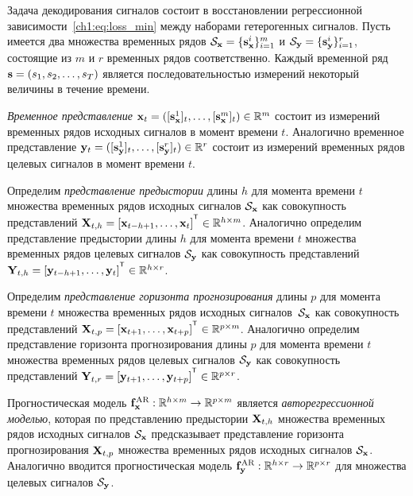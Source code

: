 \documentclass[11pt, a5paper]{dissert}
\begin{document}
Задача декодирования сигналов состоит в восстановлении регрессионной зависимости~\eqref{ch1:eq:loss_min} между наборами гетерогенных сигналов.
Пусть имеется два множества временных рядов $\mathcal{S}_{\mathbf{x}} = \{\mathbf{s}_{\mathbf{x}}^i\}_{i=1}^m$ и $\mathcal{S}_{\mathbf{y}} = \{\mathbf{s}_{\mathbf{y}}^i\}_{i=1}^r$, состоящие из $m$ и $r$ временных рядов соответственно. 
Каждый временной ряд $\mathbf{s} = (s_1, s_2, \dots, s_T)$ является последовательностью измерений некоторый величины в течение времени. 
\begin{definition}
	 \textit{Временное представление} $\mathbf{x}_t = ([\mathbf{s}_{\mathbf{x}}^1]_t, \dots, [\mathbf{s}_{\mathbf{x}}^m]_t) \in \mathbb{R}^m$ состоит из измерений временных рядов исходных сигналов в момент времени $t$. 
	Аналогично временное представление $\mathbf{y}_t = ([\mathbf{s}_{\mathbf{y}}^1]_t, \dots, [\mathbf{s}_{\mathbf{y}}^r]_t) \in \mathbb{R}^r$ состоит из измерений временных рядов целевых сигналов в момент времени $t$.
\end{definition}
\begin{definition}
	Определим \textit{представление предыстории} длины $h$ для момента времени $t$ множества временных рядов исходных сигналов $\mathcal{S}_{\mathbf{x}}$ как совокупность представлений $\bX_{t,h} = [\bx_{t - h + 1}, \dots, \bx_{t}]^{\T} \in \bbR^{h \times m}$.
	Аналогично определим представление предыстории длины $h$ для момента времени $t$ множества временных рядов целевых сигналов $\mathcal{S}_{\mathbf{y}}$ как совокупность представлений $\bY_{t,h} = [\by_{t - h + 1}, \dots, \by_{t}]^{\T} \in \bbR^{h \times r}$.
\end{definition}
\begin{definition}
	Определим \textit{представление горизонта прогнозирования} длины $p$ для момента времени $t$ множества временных рядов исходных сигналов~$\mathcal{S}_{\mathbf{x}}$ как совокупность представлений $\bX_{t,p} = [\bx_{t + 1}, \dots, \bx_{t + p}]^{\T} \in \bbR^{p \times m}$.
	Аналогично определим представление горизонта прогнозирования длины $p$ для момента времени $t$ множества временных рядов целевых сигналов $\mathcal{S}_{\mathbf{y}}$ как совокупность представлений $\bY_{t,r} = [\by_{t + 1}, \dots, \by_{t + p}]^{\T} \in \bbR^{p \times r}$.
\end{definition}

\begin{definition}
	\label{ch1:def:autoreg_model}
	Прогностическая модель $\mathbf{f}^{\text{AR}}_{\mathbf{x}}: \mathbb{R}^{h \times m} \rightarrow \mathbb{R}^{p \times m}$ является \textit{авторегрессионной моделью}, которая по представлению предыстории $\mathbf{X}_{t,h}$ множества временных рядов исходных сигналов $\mathcal{S}_{\mathbf{x}}$ предсказывает представление горизонта прогнозирования $\mathbf{X}_{t,p}$ множества временных рядов исходных сигналов $\mathcal{S}_{\mathbf{x}}$.
	Аналогично вводится прогностическая модель $\mathbf{f}^{\text{AR}}_{\mathbf{y}}: \mathbb{R}^{h \times r} \rightarrow \mathbb{R}^{p \times r}$ для множества целевых сигналов $\mathcal{S}_{\mathbf{y}}$.
\end{definition}
\end{document}
